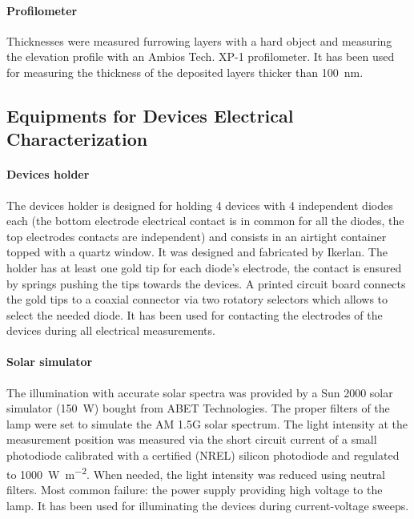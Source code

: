 		\paragraph{Profilometer} Thicknesses were measured furrowing layers with a hard object and measuring the elevation profile with an Ambios Tech. XP-1 profilometer.
		It has been used for measuring the thickness of the deposited layers thicker than \SI{100}{\nm}.

	\subsection{Equipments for Devices Electrical Characterization}

		\paragraph{Devices holder} The devices holder is designed for holding 4 devices with 4 independent diodes each (the bottom electrode electrical contact is in common for all the diodes, the top electrodes contacts are independent) and consists in an airtight container topped with a quartz window. It was designed and fabricated by Ikerlan. The holder has at least one gold tip for each diode's electrode, the contact is ensured by springs pushing the tips towards the devices. A printed circuit board connects the gold tips to a coaxial connector via two rotatory selectors which allows to select the needed diode.
		It has been used for contacting the electrodes of the devices during all electrical measurements.

		\paragraph{Solar simulator}\label{solarsimulator} The illumination with accurate solar spectra was provided by a Sun 2000 solar simulator (\SI{150}{\W}) bought from ABET Technologies. The proper filters of the lamp were set to simulate the AM 1.5G solar spectrum. The light intensity at the measurement position was measured via the short circuit current of a small photodiode calibrated with a certified (NREL) silicon photodiode and regulated to \SI{1000}{\W\per\m\squared}. When needed, the light intensity was reduced using neutral filters.
		Most common failure: the power supply providing high voltage to the lamp.
		It has been used for illuminating the devices during current-voltage sweeps.

